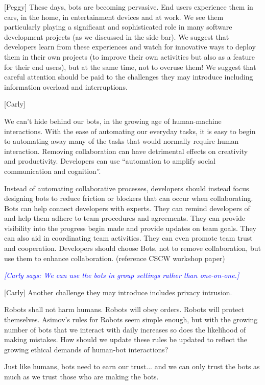 \documentclass{sig-alternate}
\newcommand{\cl}[1]{\textcolor{blue}{{\it [Carly says: #1]}}}
\begin{document}
	[Peggy]
	These days, bots are becoming pervasive.  End users experience them in cars, in the home, in entertainment devices and at work.  We see them particularly playing a significant and sophisticated role in many software development projects (as we discussed in the side bar).  
	We suggest that developers learn from these experiences and watch for innovative ways to deploy them in their own projects (to improve their own activities but also as a feature for their end users), but at the same time, not to overuse them! 
	We suggest that careful attention should be paid to the challenges they may introduce including information overload and interruptions.  
	
	
	[Carly]

	We can't hide behind our bots, in the growing age of human-machine interactions.  With the ease of automating our everyday tasks, it is easy to begin to automating away many of the tasks that would normally require human interaction. Removing collaboration can have detrimental effects on creativity and productivity. Developers can use ``automation to amplify social communication and cognition''.

	Instead of automating collaborative processes, developers should instead focus designing bots to reduce friction or blockers that can occur when collaborating. Bots can help connect developers with experts. They can remind developers of and help them adhere to team procedures and agreements. They can provide visibility into the progress begin made and provide updates on team goals. They can also aid in coordinating team activities. They can even promote team trust and cooperation. Developers should choose Bots, not to remove collaboration, but use them to enhance collaboration. (reference CSCW workshop paper)

	\cl{We can use the bots in group settings rather than one-on-one.}

	[Carly]
	Another challenge they may introduce includes privacy intrusion. 

	Robots shall not harm humans. Robots will obey orders. Robots will protect themselves.  Asimov's rules for Robots \cite{asimov1950evitable} seem simple enough, but with the growing number of bots that we interact with daily increases so does the likelihood of making mistakes. How should we update these rules be updated to reflect the growing ethical demands of human-bot interactions?

	Just like humans, bots need to earn our trust... and we can only trust the bots as much as we trust those who are making the bots. 
\end{document}
